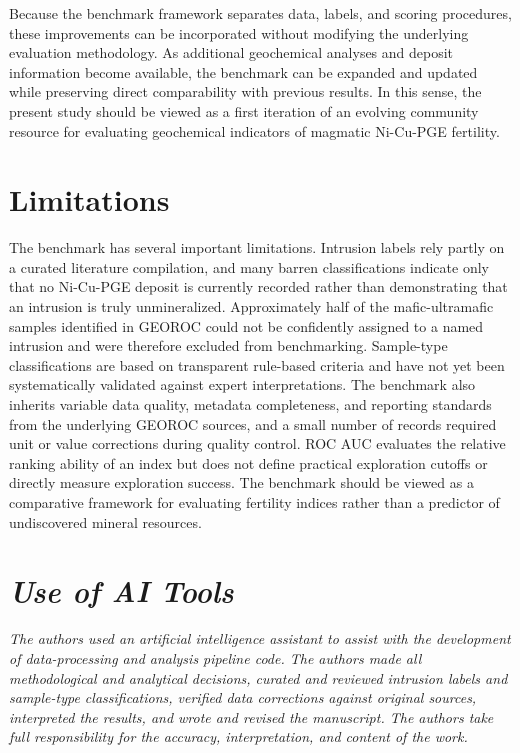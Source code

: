 \documentclass[10pt,twocolumn,letterpaper]{article}
\begin{document}
Because the benchmark framework separates data, labels, and scoring procedures, these improvements can be incorporated without modifying the underlying evaluation methodology. As additional geochemical analyses and deposit information become available, the benchmark can be expanded and updated while preserving direct comparability with previous results. In this sense, the present study should be viewed as a first iteration of an evolving community resource for evaluating geochemical indicators of magmatic Ni-Cu-PGE fertility.

\section{Limitations}

The benchmark has several important limitations. Intrusion labels rely partly on a curated literature compilation, and many barren classifications indicate only that no Ni-Cu-PGE deposit is currently recorded rather than demonstrating that an intrusion is truly unmineralized. Approximately half of the mafic-ultramafic samples identified in GEOROC could not be confidently assigned to a named intrusion and were therefore excluded from benchmarking. Sample-type classifications are based on transparent rule-based criteria and have not yet been systematically validated against expert interpretations. The benchmark also inherits variable data quality, metadata completeness, and reporting standards from the underlying GEOROC sources, and a small number of records required unit or value corrections during quality control. ROC AUC evaluates the relative ranking ability of an index but does not define practical exploration cutoffs or directly measure exploration success. The benchmark should be viewed as a comparative framework for evaluating fertility indices rather than a predictor of undiscovered mineral resources.

\section*{\textit{Use of AI Tools}}
\textit{The authors used an artificial intelligence assistant to assist with the development of data-processing and analysis pipeline code. The authors made all methodological and analytical decisions, curated and reviewed intrusion labels and sample-type classifications, verified data corrections against original sources, interpreted the results, and wrote and revised the manuscript. The authors take full responsibility for the accuracy, interpretation, and content of the work.}
\end{document}
